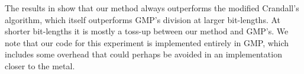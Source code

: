 The results in  show that our method always outperforms the modified Crandall's algorithm, which itself outperforms GMP's division at larger bit-lengths.
At shorter bit-lengths it is mostly a toss-up between our method and GMP's.
We note that our code for this experiment is implemented entirely in GMP, which includes some overhead that could perhaps be avoided in an implementation closer to the metal.
